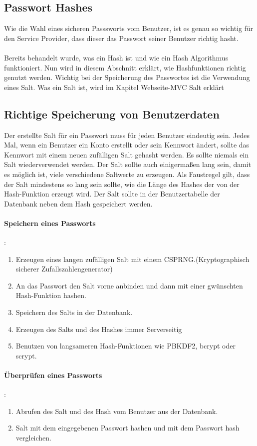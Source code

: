 {\subsection{Passwort Hashes}
\label{sec:pwdhash}
Wie die Wahl eines sicheren Passsworts vom Benutzer, ist es genau so wichtig für den Service Provider, dass dieser das Passwort seiner Benutzer richtig hasht.\\ \\Bereits behandelt wurde, was ein Hash ist und wie ein Hash Algorithmus funktioniert. Nun wird in diesem Abschnitt erklärt, wie Hashfunktionen richtig genutzt werden. Wichtig bei der Speicherung des Passwortes ist die Verwendung eines Salt. Was ein Salt ist, wird im Kapitel Webseite-MVC Salt erklärt
\subsection{Richtige Speicherung von Benutzerdaten}
Der erstellte Salt für ein Passwort muss für jeden Benutzer eindeutig sein. Jedes Mal, wenn ein Benutzer ein Konto erstellt oder sein Kennwort ändert, sollte das Kennwort mit einem neuen zufälligen Salt gehasht werden. Es sollte niemals ein Salt wiederverwendet werden. Der Salt sollte auch einigermaßen lang sein, damit es möglich ist, viele verschiedene Saltwerte zu erzeugen. Als Faustregel gilt, dass der Salt mindestens so lang sein sollte, wie die Länge des Hashes der von der Hash-Funktion erzeugt wird. Der Salt sollte in der Benutzertabelle der Datenbank neben dem Hash gespeichert werden.
\paragraph{Speichern eines Passworts}:\\
\begin{enumerate}
\item Erzeugen eines langen zufälligen Salt mit einem CSPRNG.(Kryptographisch sicherer Zufallszahlengenerator) 
\item An das Passwort den Salt vorne anbinden und dann mit einer gwünschten Hash-Funktion hashen.
\item Speichern des Salts in der Datenbank.
\item Erzeugen des Salts und des Hashes immer Serverseitig
\item Benutzen von langsameren Hash-Funktionen wie  PBKDF2, bcrypt oder scrypt.
\end{enumerate}
\paragraph{Überprüfen eines Passworts}:\\
\begin{enumerate}
\item Abrufen des Salt und des Hash vom Benutzer aus der Datenbank.
\item Salt mit dem eingegebenen Passwort hashen und mit dem Passwort hash vergleichen.
\end{enumerate}
}

